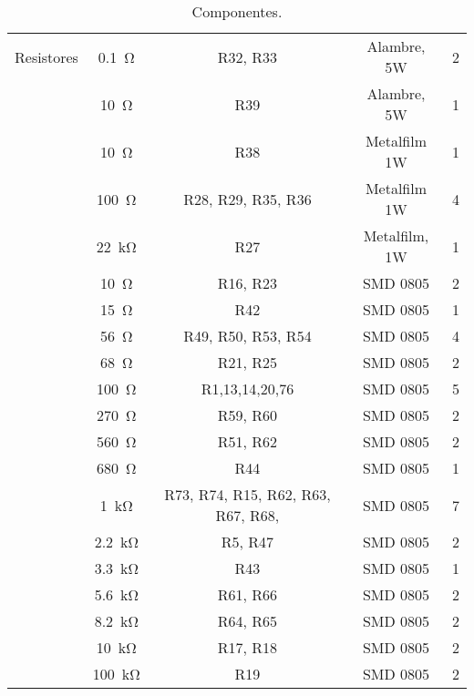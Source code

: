 \begin{table}[H]
\begin{tabular}{ccccc}
		 \midrule
Resistores      & \SI{0.1}{\ohm} & R32, R33 & Alambre, 5W & 2 \\
		& \SI{10}{\ohm} & R39 & Alambre, 5W & 1 \\		
		& \SI{10}{\ohm} & R38 & Metalfilm 1W & 1 \\
		& \SI{100}{\ohm} & R28, R29, R35, R36 & Metalfilm 1W & 4 \\
		& \SI{22}{\kilo\ohm} & R27 & Metalfilm, 1W & 1 \\
		& \SI{10}{\ohm} & R16, R23 & SMD 0805 & 2 \\
		& \SI{15}{\ohm} & R42 & SMD 0805 & 1 \\
		& \SI{56}{\ohm} & R49, R50, R53, R54 & SMD 0805 & 4 \\
		& \SI{68}{\ohm} & R21, R25 & SMD 0805 & 2 \\
		& \SI{100}{\ohm} & R1,13,14,20,76 & SMD 0805 & 5 \\
		& \SI{270}{\ohm} & R59, R60 & SMD 0805 & 2 \\ 
		& \SI{560}{\ohm} & R51, R62 & SMD 0805 & 2 \\
		& \SI{680}{\ohm} & R44 & SMD 0805 & 1\\
		& \SI{1}{\kilo\ohm} & R73, R74, R15, R62, R63, R67, R68,  & SMD 0805 & 7 \\
		& \SI{2.2}{\kilo\ohm} & R5, R47 & SMD 0805 & 2 \\ 
		& \SI{3.3}{\kilo\ohm} & R43 & SMD 0805 & 1 \\
		& \SI{5.6}{\kilo\ohm} & R61, R66 & SMD 0805 & 2 \\
		& \SI{8.2}{\kilo\ohm} & R64, R65 & SMD 0805 & 2 \\
		& \SI{10}{\kilo\ohm} & R17, R18 & SMD 0805 & 2 \\
		& \SI{100}{\kilo\ohm} & R19 & SMD 0805 & 2 \\
\bottomrule
	\end{tabular}
	\caption{Componentes.}
	\label{tab.componentes}
\end{table}
